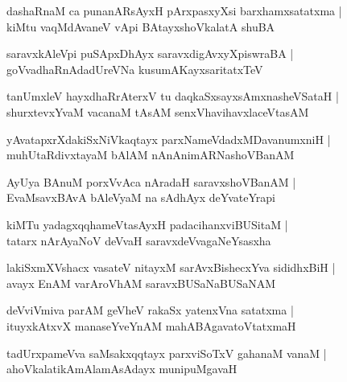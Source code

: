 \documentclass[twoside,12pt,openright]{book}
\newcounter{shloka}[chapter]
\begin{document}
\begin{shloka}%
dashaRnaM ca punanARsAyxH pArxpasxyXsi barxhamxsatatxma |\\
kiMtu vaqMdAvaneV vApi BAtayxshoVkalatA shuBA 
\end{shloka}

\begin{shloka}%
saravxkAleVpi puSApxDhAyx saravxdigAvxyXpiswraBA |\\
goVvadhaRnAdadUreVNa kusumAKayxsaritatxTeV 
\end{shloka}

\begin{shloka}%
tanUmxleV hayxdhaRrAterxV tu daqkaSxsayxsAmxnasheVSataH |\\
shurxtevxYvaM vacanaM tAsAM senxVhavihavxlaceVtasAM 
\end{shloka}

\begin{shloka}%
yAvatapxrXdakiSxNiVkaqtayx parxNameVdadxMDavanumxniH |\\
muhUtaRdivxtayaM bAlAM nAnAnimARNashoVBanAM 
\end{shloka}

\begin{shloka}%
AyUya BAnuM porxVvAca nAradaH saravxshoVBanAM |\\
EvaMsavxBAvA bAleVyaM na sAdhAyx deYvateYrapi 
\end{shloka}

\begin{shloka}%
kiMTu yadagxqqhameVtasAyxH padacihanxviBUSitaM |\\
tatarx nArAyaNoV deVvaH saravxdeVvagaNeYsasxha 
\end{shloka}

\begin{shloka}%
lakiSxmXVshacx vasateV nitayxM sarAvxBishecxYva sididhxBiH |\\
avayx EnAM varAroVhAM saravxBUSaNaBUSaNAM 
\end{shloka}

\begin{shloka}%
deVviVmiva parAM geVheV rakaSx yatenxVna satatxma |\\
ituyxkAtxvX manaseYveYnAM mahABAgavatoVtatxmaH 
\end{shloka}

\begin{shloka}%
tadUrxpameVva saMsakxqqtayx parxviSoTxV gahanaM vanaM |\\
ahoVkalatikAmAlamAsAdayx munipuMgavaH 
\end{shloka}
\end{document}

